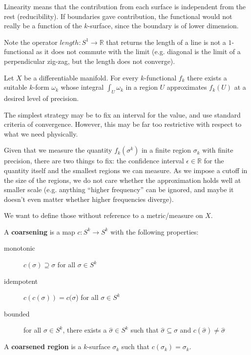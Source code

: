 \documentclass[10pt, onecolumn, longbibliography, nofootinbib]{revtex4-2}
\begin{document}
\begin{remark}
	Linearity means that the contribution from each surface is independent from the rest (reducibility). If boundaries gave contribution, the functional would not really be a function of the $k$-surface, since the boundary is of lower dimension.
	
	Note the operator $length : S^1 \to \mathbb{R}$ that returns the length of a line is not a $1$-functional as it does not commute with the limit (e.g. diagonal is the limit of a perpendicular zig-zag, but the length does not converge).
\end{remark}

\begin{desid}
	Let $X$ be a differentiable manifold. For every $k$-functional $f_k$ there exists a suitable $k$-form $\omega_k$ whose integral $\int_U \omega_k$ in a region $U$ approximates $f_k(U)$ at a desired level of precision.
\end{desid}

\begin{remark}
	The simplest strategy may be to fix an interval for the value, and use standard criteria of convergence. However, this may be far too restrictive with respect to what we need physically.
	
	Given that we measure the quantity $f_k(\sigma^k)$ in a finite region $\sigma_k$ with finite precision, there are two things to fix: the confidence interval $\epsilon \in \mathbb{R}$ for the quantity itself and the smallest regions we can measure. As we impose a cutoff in the size of the regions, we do not care whether the approximation holds well at smaller scale (e.g. anything ``higher frequency'' can be ignored, and maybe it doesn't even matter whether higher frequencies diverge).
	
	We want to define those without reference to a metric/measure on $X$.
\end{remark}

\begin{defn}
	A \textbf{coarsening} is a map $c : S^k \to S^k$ with the following properties:
	\begin{description}
		\item[monotonic] $c(\sigma) \supseteq \sigma$ for all $\sigma \in S^k$
		\item[idempotent] $c(c(\sigma)) = c(\sigma$) for all $\sigma \in S^k$
		\item[bounded] for all $\sigma \in S^k$, there exists a $\hat{\sigma} \in S^k$ such that $\hat{\sigma} \subseteq \sigma$ and $c(\hat{\sigma}) \neq \hat{\sigma}$
	\end{description}
	A \textbf{coarsened region} is a $k$-surface $\sigma_k$ such that $c(\sigma_k) = \sigma_k$. 
\end{defn}
\end{document}
